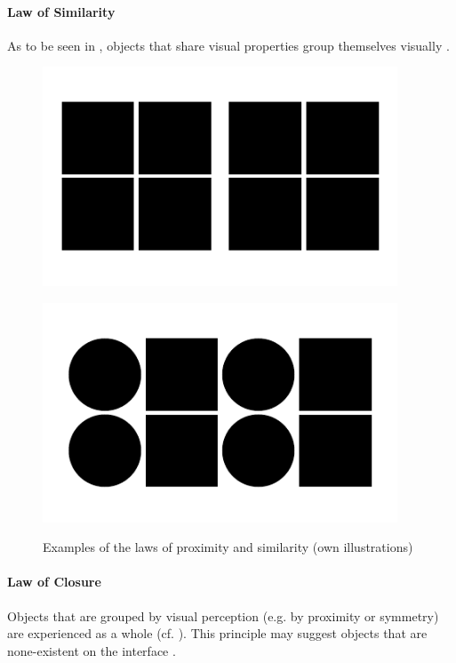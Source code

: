 \paragraph*{Law of Similarity} As to be seen in , objects that share visual properties group themselves visually \parencite[cf.][2]{Bakar.2017}.
\begin{figure}[H] 
    \begin{minipage}[b]{.5\linewidth}
        \centering\includegraphics[width=0.94\textwidth]{img/proximity.pdf}
        \label{fig:prox}
    \end{minipage}%
    \begin{minipage}[b]{.5\linewidth}
        \centering\includegraphics[width=0.94\textwidth]{img/similarity.pdf}
        \label{fig:sim}
    \end{minipage}
    \caption[Laws of Proximity and Similarity]{Examples of the laws of proximity and similarity (own illustrations)}\label{fig:law1}
\end{figure}
\paragraph*{Law of Closure} Objects that are grouped by visual perception (e.g. by proximity or symmetry) are experienced as a whole (cf. ). This principle may suggest objects that are none-existent on the interface \parencite[cf.][]{Stevenson.n.y.}.
